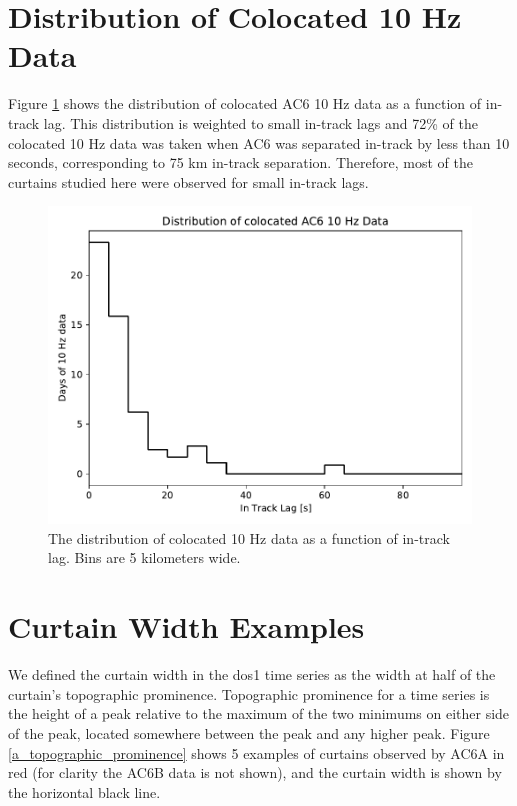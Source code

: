 \documentclass[draft]{agujournal2019}
\begin{document}
\appendix

\section{Distribution of Colocated 10 Hz Data}
Figure \ref{a_10Hz_dist} shows the distribution of colocated AC6 10 Hz data as a function of in-track lag. This distribution is weighted to small in-track lags and 72\% of the colocated 10 Hz data was taken when AC6 was separated in-track by less than 10 seconds, corresponding to 75 km in-track separation. Therefore, most of the curtains studied here were observed for small in-track lags.

\begin{figure}
\includegraphics[width=\textwidth]{a_10hz_dist.pdf}
\caption{The distribution of colocated 10 Hz data as a function of in-track lag. Bins are 5 kilometers wide.}
\label{a_10Hz_dist}
\end{figure}

\section{Curtain Width Examples}
We defined the curtain width in the dos1 time series as the width at half of the curtain's topographic prominence. Topographic prominence for a time series is the height of a peak relative to the maximum of the two minimums on either side of the peak, located somewhere between the peak and any higher peak. Figure \ref{a_topographic_prominence} shows 5 examples of curtains observed by AC6A in red (for clarity the AC6B data is not shown), and the curtain width is shown by the horizontal black line.
\end{document}
